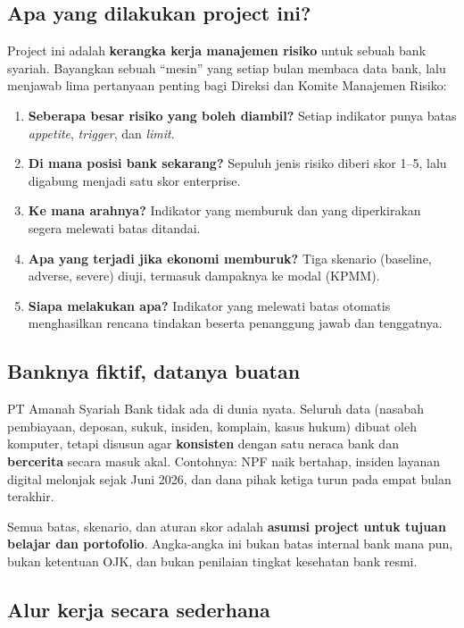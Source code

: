 \documentclass[11pt,a4paper]{article}
\begin{document}
\subsection{Apa yang dilakukan project ini?}

Project ini adalah \textbf{kerangka kerja manajemen risiko} untuk sebuah bank syariah. Bayangkan sebuah ``mesin'' yang setiap bulan membaca data bank, lalu menjawab lima pertanyaan penting bagi Direksi dan Komite Manajemen Risiko:

\begin{enumerate}
\item \textbf{Seberapa besar risiko yang boleh diambil?} Setiap indikator punya batas \emph{appetite}, \emph{trigger}, dan \emph{limit}.
\item \textbf{Di mana posisi bank sekarang?} Sepuluh jenis risiko diberi skor 1--5, lalu digabung menjadi satu skor enterprise.
\item \textbf{Ke mana arahnya?} Indikator yang memburuk dan yang diperkirakan segera melewati batas ditandai.
\item \textbf{Apa yang terjadi jika ekonomi memburuk?} Tiga skenario (baseline, adverse, severe) diuji, termasuk dampaknya ke modal (KPMM).
\item \textbf{Siapa melakukan apa?} Indikator yang melewati batas otomatis menghasilkan rencana tindakan beserta penanggung jawab dan tenggatnya.
\end{enumerate}

\subsection{Banknya fiktif, datanya buatan}

PT Amanah Syariah Bank tidak ada di dunia nyata. Seluruh data (nasabah pembiayaan, deposan, sukuk, insiden, komplain, kasus hukum) dibuat oleh komputer, tetapi disusun agar \textbf{konsisten} dengan satu neraca bank dan \textbf{bercerita} secara masuk akal. Contohnya: NPF naik bertahap, insiden layanan digital melonjak sejak Juni 2026, dan dana pihak ketiga turun pada empat bulan terakhir.

\begin{warnbox}
Semua batas, skenario, dan aturan skor adalah \textbf{asumsi project untuk tujuan belajar dan portofolio}. Angka-angka ini bukan batas internal bank mana pun, bukan ketentuan OJK, dan bukan penilaian tingkat kesehatan bank resmi.
\end{warnbox}

\subsection{Alur kerja secara sederhana}
\end{document}
